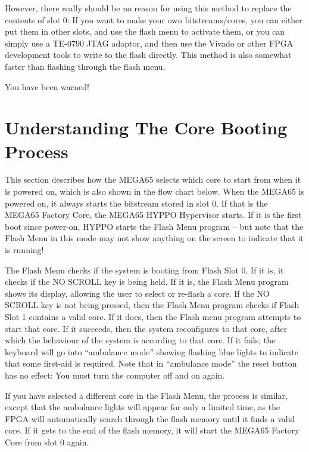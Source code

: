 However, there really should be no reason for using this method to replace the contents of slot 0:
If you want to make your own bitstreams/cores, you can either put them in other slots, and use the
flash menu to activate them, or you can simply use a TE-0790 JTAG adaptor, and then use
the Vivado or other FPGA development tools to write to the flash directly. This method is also
somewhat faster than flashing through the flash menu.

You have been warned!

\section{Understanding The Core Booting Process}

This section describes how the MEGA65 selects which core to start from when it is powered on,
which is also shown in the flow chart below. When the MEGA65 is
powered on, it always starts the bitstream stored in slot 0.
If that is the MEGA65 Factory Core, the MEGA65 HYPPO
Hypervisor starts.  If it is the first boot since power-on, HYPPO
starts the Flash Menu program -- but note that the Flash Menu in
this mode may not show anything on the screen to indicate that it is
running!

The Flash Menu checks if the system is booting from Flash
Slot 0.  If it is, it checks if the NO SCROLL key is being held.  If
it is, the Flash Menu program shows its display, allowing the user
to select or re-flash a core. If the NO SCROLL key is not being
pressed, then the Flash Menu program checks if Flash Slot 1 contains a valid
core.  If it does, then the Flash menu program attempts to start
that core.  If it succeeds, then the system reconfigures to that core,
after which the behaviour of the system is according to that core. If
it fails, the keyboard will go into ``ambulance mode'' showing flashing blue
lights to indicate that some first-aid is required.  Note that in ``ambulance
mode'' the reset button has no effect: You must turn the computer off
and on again.

If you have selected a different core in the Flash Menu, the process
is similar, except that the ambulance lights will appear for only a
limited time, as the FPGA will automatically search through the flash
memory until it finds a valid core. If it gets to the end of the flash
memory, it will start the MEGA65 Factory Core from slot 0 again.

